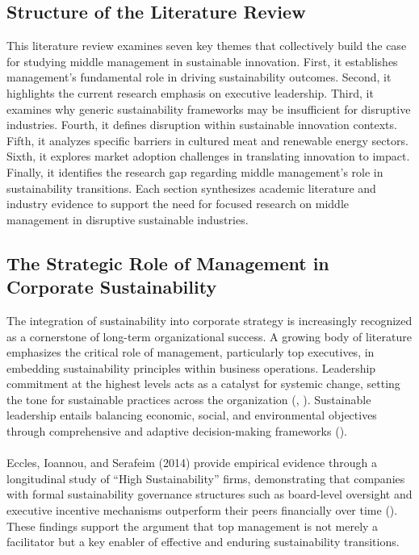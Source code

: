 	\subsection*{Structure of the Literature Review}
	This literature review examines seven key themes that collectively build the case for studying middle management in sustainable innovation. First, it establishes management’s fundamental role in driving sustainability outcomes. Second, it highlights the current research emphasis on executive leadership. Third, it examines why generic sustainability frameworks may be insufficient for disruptive industries. Fourth, it defines disruption within sustainable innovation contexts. Fifth, it analyzes specific barriers in cultured meat and renewable energy sectors. Sixth, it explores market adoption challenges in translating innovation to impact. Finally, it identifies the research gap regarding middle management’s role in sustainability transitions. Each section synthesizes academic literature and industry evidence to support the need for focused research on middle management in disruptive sustainable industries.
	
	\subsection{The Strategic Role of Management in Corporate Sustainability}
	The integration of sustainability into corporate strategy is increasingly recognized as a cornerstone of long-term organizational success. A growing body of literature emphasizes the critical role of management, particularly top executives, in embedding sustainability principles within business operations. Leadership commitment at the highest levels acts as a catalyst for systemic change, setting the tone for sustainable practices across the organization (\textcite{Avery2005}, \textcite{Waldman2008}). Sustainable leadership entails balancing economic, social, and environmental objectives through comprehensive and adaptive decision-making frameworks (\textcite{Lozano2015}).
	
	\paragraph*{} Eccles, Ioannou, and Serafeim (2014) provide empirical evidence through a longitudinal study of “High Sustainability” firms, demonstrating that companies with formal sustainability governance structures such as board-level oversight and executive incentive mechanisms outperform their peers financially over time (\textcite{Eccles2014}). These findings support the argument that top management is not merely a facilitator but a key enabler of effective and enduring sustainability transitions.
	
